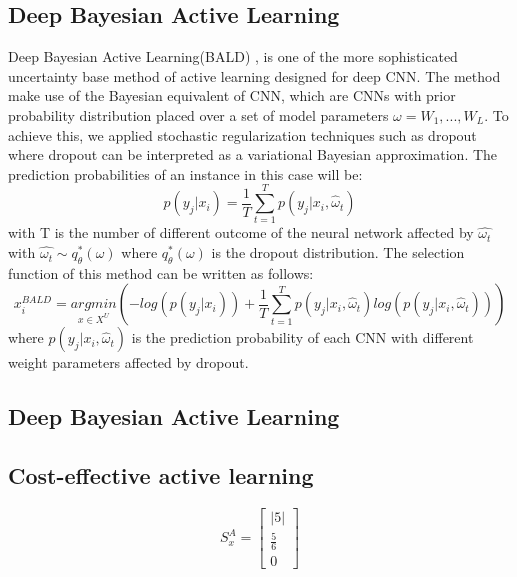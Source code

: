 \subsection{Deep Bayesian Active Learning}
Deep Bayesian Active Learning(BALD) \citet{GalIG17}, is one of the more sophisticated uncertainty base method of active learning designed for deep CNN. The method make use of the Bayesian equivalent of CNN\citet{gal2015bayesian}, which are CNNs with prior probability distribution placed over a set of model parameters $\omega = {W_1, ... , W_L}$. To achieve this, we applied stochastic regularization techniques such as dropout where dropout can be interpreted as a variational Bayesian approximation. The prediction probabilities of an instance in this case will be:
\begin{equation}
    p(y_j|x_i) = \frac{1}{T} \sum_{t=1}^Tp(y_j|x_i, \hat{\omega}_t)
\end{equation} 
with T is the number of different outcome of the neural network affected by $\hat{\omega{_t}}$ with $\hat{\omega{_t}} \sim q^{*}_\theta(\omega)$ where  $q^{*}_\theta(\omega)$ is the dropout distribution. The selection function of this method can be written as follows:
\begin{equation}
    x^{BALD}_i =\underset{x \in X^U}{argmin} (- log(p(y_j|x_i)) + \frac{1}{T}\sum_{t=1}^Tp(y_j|x_i,\hat{\omega}_t)log(p(y_j|x_i,\hat{\omega}_t)))
\end{equation}
where $p(y_j|x_i, \hat{\omega}_t)$ is the prediction probability of each CNN with different weight parameters affected by dropout.  
\subsection{Deep Bayesian Active Learning}    
\subsection{Cost-effective active learning}
\begin{equation}
    S^{A}_{x} = \begin{bmatrix}
       |5| \\[0.3em]
       \frac{5}{6} \\[0.3em]
       0           
     \end{bmatrix}
\end{equation}
